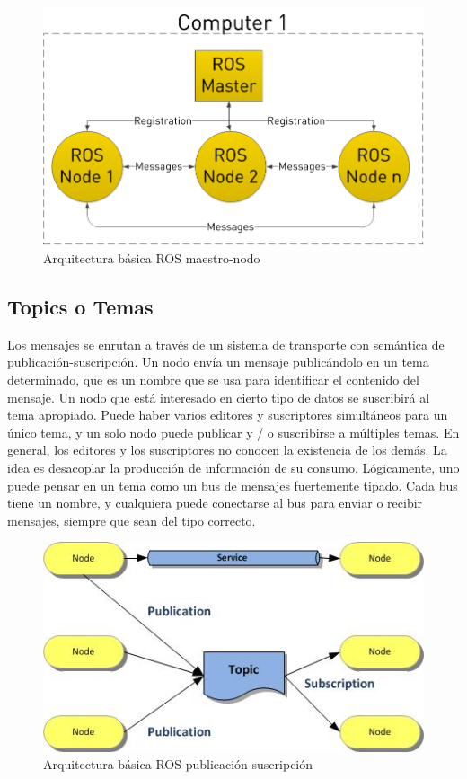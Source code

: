 \begin{figure}[H]
    \centering
    \includegraphics[scale=0.45]{img/ros-architecture.png}
  	\caption{Arquitectura básica ROS maestro-nodo}
  	\label{fig:ros-arch}
\end{figure}

\subsection{Topics o Temas}
Los mensajes se enrutan a través de un sistema de transporte con semántica de publicación-suscripción. Un nodo envía un mensaje publicándolo en un tema determinado, que es un nombre que se usa para identificar el contenido del mensaje. Un nodo que está interesado en cierto tipo de datos se suscribirá al tema apropiado. Puede haber varios editores y suscriptores simultáneos para un único tema, y un solo nodo puede publicar y / o suscribirse a múltiples temas. En general, los editores y los suscriptores no conocen la existencia de los demás. La idea es desacoplar la producción de información de su consumo. Lógicamente, uno puede pensar en un tema como un bus de mensajes fuertemente tipado. Cada bus tiene un nombre, y cualquiera puede conectarse al bus para enviar o recibir mensajes, siempre que sean del tipo correcto.

\begin{figure}[H]
    \centering
    \includegraphics[scale=1]{img/ros-architecture-3.jpg}
  	\caption{Arquitectura básica ROS publicación-suscripción}
  	\label{fig:ros-servicio}
\end{figure}

